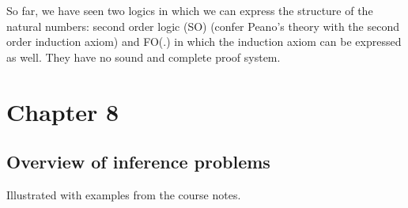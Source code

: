 \documentclass[10pt,a4paper]{article}
\theoremstyle{definition}
\begin{document}
So far, we have seen two logics in which we can express the structure of the natural numbers: second order logic (SO) (confer Peano’s theory with the second order induction axiom) and FO(.) in which the induction axiom can be expressed as well. They have no sound and complete proof system.


\section{Chapter 8}

\subsection{Overview of inference problems}

Illustrated with examples from the course notes.
\end{document}
